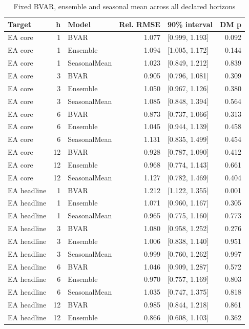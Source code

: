 \begin{table}[htbp]
\centering
\footnotesize
\caption{Fixed BVAR, ensemble and seasonal mean across all declared horizons}
\begin{tabularx}{\linewidth}{XrlrXr}
\toprule
Target & h & Model & Rel. RMSE & 90\% interval & DM p \\
\midrule
EA core & 1 & BVAR & 1.077 & [0.999, 1.193] & 0.092 \\
EA core & 1 & Ensemble & 1.094 & [1.005, 1.172] & 0.144 \\
EA core & 1 & SeasonalMean & 1.023 & [0.849, 1.212] & 0.839 \\
EA core & 3 & BVAR & 0.905 & [0.796, 1.081] & 0.309 \\
EA core & 3 & Ensemble & 1.050 & [0.967, 1.126] & 0.380 \\
EA core & 3 & SeasonalMean & 1.085 & [0.848, 1.394] & 0.564 \\
EA core & 6 & BVAR & 0.873 & [0.737, 1.066] & 0.313 \\
EA core & 6 & Ensemble & 1.045 & [0.944, 1.139] & 0.458 \\
EA core & 6 & SeasonalMean & 1.131 & [0.835, 1.499] & 0.454 \\
EA core & 12 & BVAR & 0.928 & [0.787, 1.090] & 0.412 \\
EA core & 12 & Ensemble & 0.968 & [0.774, 1.143] & 0.661 \\
EA core & 12 & SeasonalMean & 1.127 & [0.782, 1.469] & 0.404 \\
EA headline & 1 & BVAR & 1.212 & [1.122, 1.355] & 0.001 \\
EA headline & 1 & Ensemble & 1.071 & [0.960, 1.167] & 0.305 \\
EA headline & 1 & SeasonalMean & 0.965 & [0.775, 1.160] & 0.773 \\
EA headline & 3 & BVAR & 1.080 & [0.958, 1.252] & 0.276 \\
EA headline & 3 & Ensemble & 1.006 & [0.838, 1.140] & 0.951 \\
EA headline & 3 & SeasonalMean & 0.999 & [0.760, 1.262] & 0.997 \\
EA headline & 6 & BVAR & 1.046 & [0.909, 1.287] & 0.572 \\
EA headline & 6 & Ensemble & 0.970 & [0.757, 1.169] & 0.803 \\
EA headline & 6 & SeasonalMean & 1.035 & [0.747, 1.375] & 0.818 \\
EA headline & 12 & BVAR & 0.985 & [0.844, 1.218] & 0.861 \\
EA headline & 12 & Ensemble & 0.866 & [0.608, 1.103] & 0.362 \\

\end{tabularx}
\end{table}
